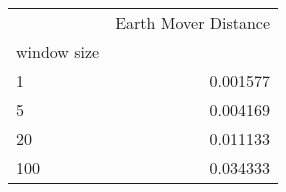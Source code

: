 \begin{tabular}{lr}
\toprule
{} &  Earth Mover Distance \\
window size &                       \\
\midrule
1           &              0.001577 \\
5           &              0.004169 \\
20          &              0.011133 \\
100         &              0.034333 \\
\bottomrule
\end{tabular}
